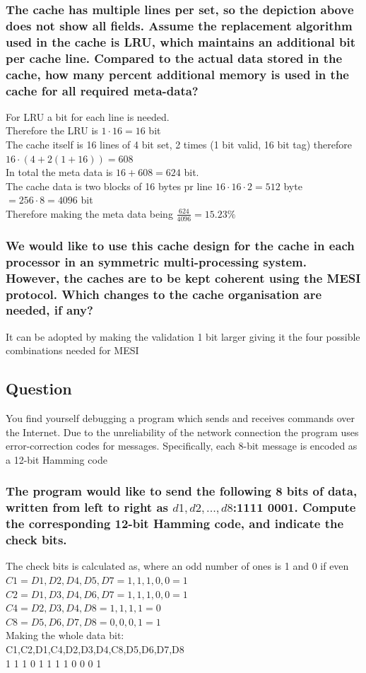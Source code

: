 \documentclass[12pt, a4paper]{article}
\begin{document}
			\subsubsection{The cache has multiple lines per set, so the depiction above does not show all fields. Assume the replacement algorithm used in the cache is LRU, which maintains an additional bit per cache line. Compared to the actual data stored in the cache, how many percent additional memory is used in the cache for all required meta-data?}
				For LRU a bit for each line is needed.\\
				Therefore the LRU is $1 \cdot 16 =16$ bit\\
				The cache itself is 16 lines of 4 bit set, 2 times (1 bit valid, 16 bit tag) therefore $16\cdot (4+2(1+16))=608$\\
				In total the meta data is $16+608=624$ bit.\\
				The cache data is two blocks of 16 bytes pr line $16\cdot 16\cdot 2 = 512$ byte $=256\cdot 8=4096$ bit\\
				Therefore making the meta data being $\frac{624}{4096}=15.23\%$
			\subsubsection{We would like to use this cache design for the cache in each processor in an symmetric multi-processing system. However, the caches are to be kept coherent using the MESI protocol. Which changes to the cache organisation are needed, if any?}
				It can be adopted by making the validation 1 bit larger giving it the four possible combinations needed for MESI
		\subsection{Question}
			You find yourself debugging a program which sends and receives commands over the Internet. Due to the unreliability of the network connection the program uses error-correction codes for messages. Specifically, each 8-bit message is encoded as a 12-bit Hamming code
			\subsubsection{The program would like to send the following 8 bits of data, written from left to right as $d1,d2,. . . ,d8$:1111 0001. Compute the corresponding 12-bit Hamming code, and indicate the check bits.}
				The check bits is calculated as, where an odd number of ones is 1 and 0 if even\\
				$C1=D1,D2,D4,D5,D7=1,1,1,0,0=1$\\
				$C2=D1,D3,D4,D6,D7=1,1,1,0,0=1$\\
				$C4=D2,D3,D4,D8=1,1,1,1=0$\\
				$C8=D5,D6,D7,D8=0,0,0,1=1$\\
				Making the whole data bit:\\
				C1,C2,D1,C4,D2,D3,D4,C8,D5,D6,D7,D8\\
				1 1 1 0 1 1 1 1 0 0 0 1
\end{document}
